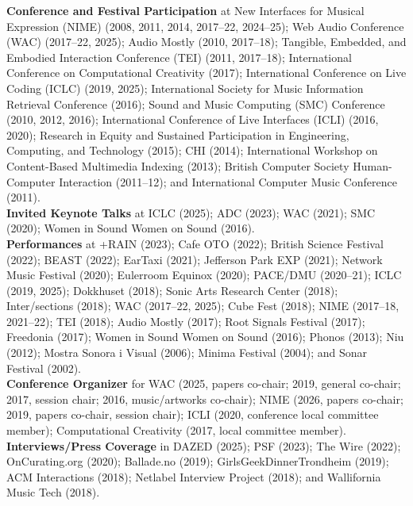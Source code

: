 \documentclass[10pt, a4paper]{article}
\begin{document}
{\textbf{Conference and Festival Participation}} at New Interfaces for Musical Expression (NIME) (2008, 2011, 2014, 2017--22, 2024--25); Web Audio Conference (WAC) (2017--22, 2025); Audio Mostly (2010, 2017--18); Tangible, Embedded, and Embodied Interaction Conference (TEI) (2011, 2017--18); International Conference on Computational Creativity (2017); International Conference on Live Coding (ICLC) (2019, 2025); International Society for Music Information Retrieval Conference (2016); Sound and Music Computing (SMC) Conference (2010, 2012, 2016); International Conference of Live Interfaces (ICLI) (2016, 2020); Research in Equity and Sustained Participation in Engineering, Computing, and Technology (2015); CHI (2014); International Workshop on Content-Based Multimedia Indexing (2013); British Computer Society Human-Computer Interaction (2011--12); and International Computer Music Conference (2011).\\

{\textbf{Invited Keynote Talks}} at ICLC (2025); ADC (2023); WAC (2021); SMC (2020); Women in Sound Women on Sound (2016).\\

{\textbf{Performances}} at +RAIN (2023); Cafe OTO (2022); British Science Festival (2022); BEAST (2022); EarTaxi (2021); Jefferson Park EXP (2021); Network Music Festival (2020); Eulerroom Equinox (2020); PACE/DMU (2020--21); ICLC (2019, 2025); Dokkhuset (2018); Sonic Arts Research Center (2018); Inter/sections (2018); WAC (2017--22, 2025); Cube Fest (2018); NIME (2017--18, 2021--22); TEI  (2018); Audio Mostly (2017); Root Signals Festival (2017); Freedonia (2017); Women in Sound Women on Sound (2016); Phonos (2013); Niu (2012); Mostra Sonora i Visual (2006); Minima Festival (2004); and Sonar Festival (2002).\\

{\textbf{Conference Organizer}} for WAC (2025, papers co-chair; 2019, general co-chair; 2017, session chair; 2016, music/artworks co-chair); NIME (2026, papers co-chair; 2019, papers co-chair, session chair); ICLI (2020, conference local committee member); Computational Creativity (2017, local committee member).\\

{\textbf{Interviews/Press Coverage}} in DAZED (2025); PSF (2023); The Wire (2022); OnCurating.org (2020); Ballade.no (2019); GirlsGeekDinnerTrondheim (2019); ACM Interactions (2018); Netlabel Interview Project (2018); and Wallifornia Music Tech (2018).\\
\end{document}
